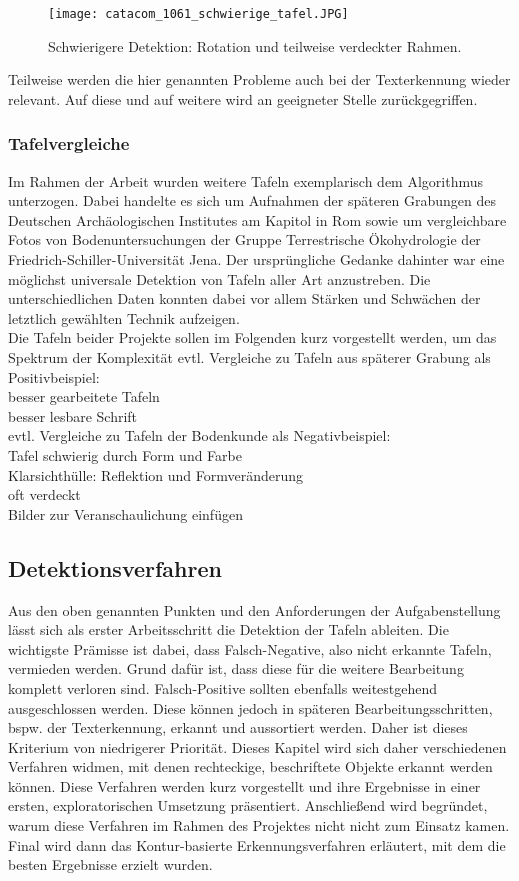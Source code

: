 \begin{figure}[!h]
\texttt{[image: catacom\_1061\_schwierige\_tafel.JPG]}
\caption{Schwierigere Detektion: Rotation und teilweise verdeckter Rahmen.}
\label{fig:schwierigetafel}
\end{figure}
Teilweise werden die hier genannten Probleme auch bei der Texterkennung wieder relevant. Auf diese und auf weitere wird an geeigneter Stelle zurückgegriffen.


\subsubsection{Tafelvergleiche}

Im Rahmen der Arbeit wurden weitere Tafeln exemplarisch dem Algorithmus unterzogen. Dabei handelte es sich um Aufnahmen der späteren Grabungen des Deutschen Archäologischen Institutes am Kapitol in Rom sowie um vergleichbare Fotos von Bodenuntersuchungen der Gruppe Terrestrische Ökohydrologie der Friedrich-Schiller-Universität Jena. Der ursprüngliche Gedanke dahinter war eine möglichst universale Detektion von Tafeln aller Art anzustreben. Die unterschiedlichen Daten konnten dabei vor allem Stärken und Schwächen der letztlich gewählten Technik aufzeigen.\\
Die Tafeln beider Projekte sollen im Folgenden kurz vorgestellt werden, um das Spektrum der Komplexität 
evtl. Vergleiche zu Tafeln aus späterer Grabung als Positivbeispiel:\\
besser gearbeitete Tafeln\\
besser lesbare Schrift\\
evtl. Vergleiche zu Tafeln der Bodenkunde als Negativbeispiel:\\
Tafel schwierig durch Form und Farbe\\
Klarsichthülle: Reflektion und Formveränderung\\
oft verdeckt\\
Bilder zur Veranschaulichung einfügen


\subsection{Detektionsverfahren}

Aus den oben genannten Punkten und den Anforderungen der Aufgabenstellung lässt sich als erster Arbeitsschritt die Detektion der Tafeln ableiten. Die wichtigste Prämisse ist dabei, dass Falsch-Negative, also nicht erkannte Tafeln, vermieden werden. Grund dafür ist, dass diese für die weitere Bearbeitung komplett verloren sind. Falsch-Positive sollten ebenfalls weitestgehend ausgeschlossen werden. Diese können jedoch in späteren Bearbeitungsschritten, bspw. der Texterkennung, erkannt und aussortiert werden. Daher ist dieses Kriterium von niedrigerer Priorität.
Dieses Kapitel wird sich daher verschiedenen Verfahren widmen, mit denen rechteckige, beschriftete Objekte erkannt werden können. Diese Verfahren werden kurz vorgestellt und ihre Ergebnisse in einer ersten, exploratorischen Umsetzung präsentiert. Anschließend wird begründet, warum diese Verfahren im Rahmen des Projektes nicht nicht zum Einsatz kamen. Final wird dann das Kontur-basierte Erkennungsverfahren erläutert, mit dem die besten Ergebnisse erzielt wurden.

